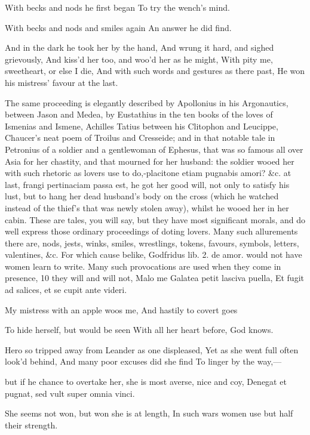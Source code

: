 {With becks and nods he first began
To try the wench's mind.

With becks and nods and smiles again
An answer he did find.

And in the dark he took her by the hand,
And wrung it hard, and sighed grievously,
And kiss'd her too, and woo'd her as he might,
With pity me, sweetheart, or else I die,
And with such words and gestures as there past,
He won his mistress' favour at the last.

The same proceeding is elegantly described by Apollonius in his
Argonautics, between Jason and Medea, by Eustathius in the ten books of
the loves of Ismenias and Ismene, Achilles Tatius between his Clitophon
and Leucippe, Chaucer's neat poem of Troilus and Cresseide; and in that
notable tale in Petronius of a soldier and a gentlewoman of Ephesus,
that was so famous all over Asia for her chastity, and that mourned for
her husband: the soldier wooed her with such rhetoric as lovers use to
do,-placitone etiam pugnabis amori? \&c. at last, frangi pertinaciam
passa est, he got her good will, not only to satisfy his lust,
but to hang her dead husband's body on the cross (which he
watched instead of the thief's that was newly stolen away), whilst he
wooed her in her cabin. These are tales, you will say, but they have
most significant morals, and do well express those ordinary proceedings
of doting lovers.
Many such allurements there are, nods, jests, winks, smiles,
wrestlings, tokens, favours, symbols, letters, valentines, \&c. For
which cause belike, Godfridus lib. 2. de amor. would not have women
learn to write. Many such provocations are used when they come in
presence, 10 they will and will not,
Malo me Galatea petit lasciva puella,
Et fugit ad salices, et se cupit ante videri.


My mistress with an apple woos me,
And hastily to covert goes

To hide herself, but would be seen
With all her heart before, God knows.

Hero so tripped away from Leander as one displeased,
Yet as she went full often look'd behind,
And many poor excuses did she find
To linger by the way,---

but if he chance to overtake her, she is most averse, nice and coy,
Denegat et pugnat, sed vult super omnia vinci.

She seems not won, but won she is at length,
In such wars women use but half their strength.

}
